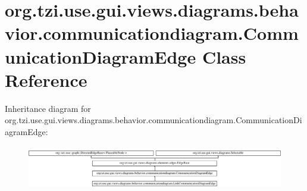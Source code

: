 \hypertarget{classorg_1_1tzi_1_1use_1_1gui_1_1views_1_1diagrams_1_1behavior_1_1communicationdiagram_1_1_communication_diagram_edge}{\section{org.\-tzi.\-use.\-gui.\-views.\-diagrams.\-behavior.\-communicationdiagram.\-Communication\-Diagram\-Edge Class Reference}
\label{classorg_1_1tzi_1_1use_1_1gui_1_1views_1_1diagrams_1_1behavior_1_1communicationdiagram_1_1_communication_diagram_edge}
}
Inheritance diagram for org.\-tzi.\-use.\-gui.\-views.\-diagrams.\-behavior.\-communicationdiagram.\-Communication\-Diagram\-Edge\-:\begin{figure}[H]
\begin{center}
\leavevmode
\includegraphics[height=1.982301cm]{classorg_1_1tzi_1_1use_1_1gui_1_1views_1_1diagrams_1_1behavior_1_1communicationdiagram_1_1_communication_diagram_edge}
\end{center}
\end{figure}
